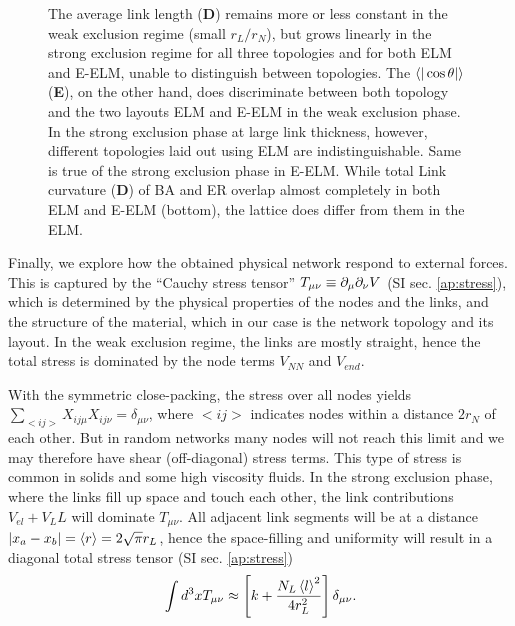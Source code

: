 \documentclass[nofootinbib,preprint,floatfix,titlepage,endfloats]{revtex4} %
\begin{document}
\begin{figure}
{         The average link length ({\bf D})  
         remains more or less constant in the weak exclusion regime (small $r_L/r_N$), but grows linearly in the strong exclusion regime for all three topologies and for both ELM and E-ELM, unable to distinguish between topologies.  
         The $\be{|\cos\theta |}$ ({\bf E}), on the other hand, does discriminate between both topology and the two layouts ELM and E-ELM in the weak exclusion phase. 
         In the strong exclusion phase at large link thickness, however, different topologies laid out using ELM are indistinguishable. Same is true of the strong exclusion phase in E-ELM. 
         While total Link curvature ({\bf D}) of BA and ER overlap almost completely in both ELM and E-ELM (bottom), the lattice does differ from them in the ELM. }    
    \label{fig:phase-compare2}
\end{figure}


Finally, we explore how the obtained physical network respond to external forces. This is captured by the ``Cauchy stress tensor'' $T_{\mu\nu} \equiv \partial_\mu\partial_\nu V$ \cite{irgens2008continuum} (SI sec. \ref{ap:stress}), which is determined by the physical properties of the nodes and the links, and the structure of the material, which in our case is the network topology and its layout. 
In the weak exclusion regime, the links are mostly straight, hence the total stress is dominated by the node terms $V_{NN}$ and $V_{end}$. 

With the symmetric close-packing, the stress over all nodes yields $\sum_{<ij>} X_{ij\mu}X_{ij\nu} = \delta_{\mu\nu}$, where $<ij>$ indicates nodes within a distance $2r_N$ of each other. 
But in random networks many nodes will not reach this limit and we may therefore have shear (off-diagonal) stress terms. This type of stress is common in solids and some high viscosity fluids.  
In the strong exclusion phase, where the links fill up space and touch each other,
the link contributions $V_{el}+V_LL$ will dominate $T_{\mu\nu}$. All adjacent link segments will be at a distance $|x_a-x_b| = \left<r\right> = 2\sqrt{\pi} r_L$,
  hence the space-filling and uniformity will result in a diagonal total stress tensor (SI sec. \ref{ap:stress}) %
\begin{equation}
    \mbox{}\int d^3x  T_{\mu\nu} \approx \left[ k + {N_L \left<l\right>^2\over 4r_L^2}   \right]\delta_{\mu\nu} \label{eq:Tstrong}
.\end{equation}
\end{document}
